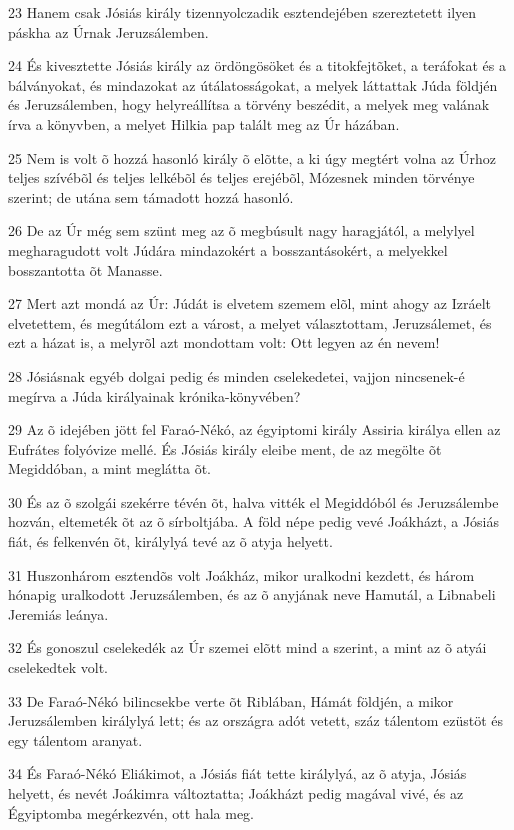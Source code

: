 \par 23 Hanem csak Jósiás király tizennyolczadik esztendejében szereztetett ilyen páskha az Úrnak Jeruzsálemben.
\par 24 És kivesztette Jósiás király az ördöngösöket és a titokfejtõket, a teráfokat és a bálványokat, és mindazokat az útálatosságokat, a melyek láttattak Júda földjén és Jeruzsálemben, hogy helyreállítsa a törvény beszédit, a melyek meg valának írva a könyvben, a melyet  Hilkia pap talált meg az Úr házában.
\par 25 Nem is volt õ hozzá hasonló király õ elõtte, a ki úgy megtért volna az Úrhoz teljes szívébõl és teljes lelkébõl és teljes erejébõl, Mózesnek minden törvénye szerint; de utána sem támadott hozzá hasonló.
\par 26 De az Úr még sem szünt meg az õ megbúsult nagy haragjától, a melylyel megharagudott volt Júdára mindazokért a bosszantásokért, a melyekkel bosszantotta õt Manasse.
\par 27 Mert azt mondá az Úr: Júdát is elvetem szemem elõl, mint ahogy az Izráelt elvetettem, és megútálom ezt a várost, a melyet választottam, Jeruzsálemet, és ezt a házat is,  a melyrõl azt mondottam volt: Ott legyen az én nevem!
\par 28 Jósiásnak egyéb dolgai pedig és minden cselekedetei, vajjon nincsenek-é megírva a Júda királyainak krónika-könyvében?
\par 29 Az õ idejében jött fel Faraó-Nékó, az égyiptomi király Assiria királya ellen az Eufrátes folyóvize mellé. És Jósiás király eleibe ment, de az megölte õt Megiddóban, a mint meglátta õt.
\par 30 És az õ szolgái szekérre tévén õt, halva vitték el Megiddóból és Jeruzsálembe hozván, eltemeték õt az õ sírboltjába. A föld népe pedig vevé Joákházt,  a Jósiás fiát, és felkenvén õt, királylyá tevé az õ atyja helyett.
\par 31 Huszonhárom esztendõs volt Joákház, mikor uralkodni kezdett, és három hónapig uralkodott Jeruzsálemben, és az õ anyjának neve Hamutál, a Libnabeli Jeremiás leánya.
\par 32 És gonoszul cselekedék az Úr szemei elõtt mind a szerint, a mint az õ atyái cselekedtek volt.
\par 33 De Faraó-Nékó bilincsekbe verte õt Riblában, Hámát földjén, a mikor Jeruzsálemben királylyá lett; és az országra adót vetett, száz tálentom ezüstöt és egy tálentom aranyat.
\par 34 És Faraó-Nékó Eliákimot, a Jósiás fiát tette királylyá, az õ atyja, Jósiás helyett, és nevét Joákimra változtatta; Joákházt pedig magával vivé, és az Égyiptomba megérkezvén, ott hala meg.

